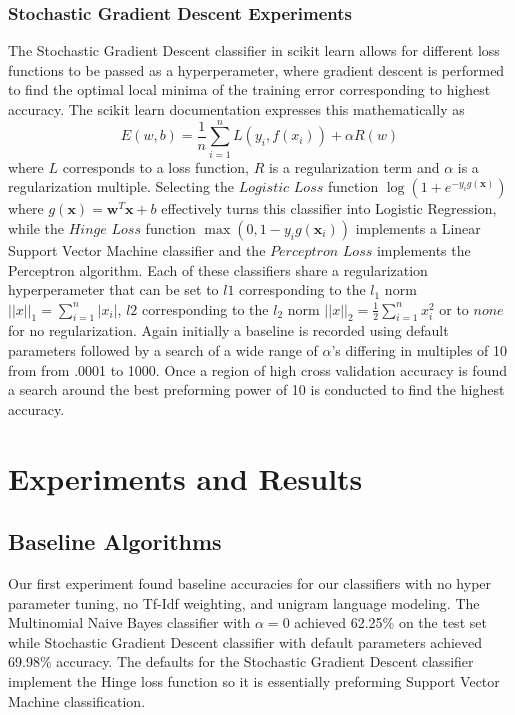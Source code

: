 \documentclass[a4paper, 12pt]{article}
\begin{document}
\subsubsection{Stochastic Gradient Descent Experiments}
The Stochastic Gradient Descent classifier in scikit learn allows for different loss functions to be passed as a hyperperameter, where gradient descent is performed to find the optimal local minima of the training error corresponding to highest accuracy. The scikit learn documentation \cite{pedregosa2011scikit} expresses this mathematically as 
\[E(w,b)=\frac{1}{n}\sum_{i=1}^{n}L(y_i,f(x_i))+\alpha R(w)\]
where $L$ corresponds to a loss function, $R$ is a regularization term and $\alpha$ is a regularization multiple. Selecting the $Logistic$ $Loss$ function $\log(1+e^{-y_ig(\bm{x})})$ where $g(\bm{x})=\bm{w}^T\bm{x}+b$ effectively turns this classifier into Logistic Regression, while the $Hinge$ $Loss$ function  $\max(0, 1 - y_ig(\bm{x}_i))$ implements a Linear Support Vector Machine classifier and the $Perceptron$ $Loss$ implements the Perceptron algorithm.  Each of these classifiers share a regularization hyperperameter that can be set to $l1$ corresponding to the $l_1$ norm $||x||_1=\sum_{i=1}^n |x_i|$, $l2$ corresponding to the $l_2$ norm $||x||_2= \frac{1}{2} \sum_{i=1}^{n} x_i^2$ or to $none$ for no regularization. Again initially a baseline is recorded using default parameters followed by a search of a  wide range of $\alpha$'s differing in multiples of 10 from from .0001 to 1000. Once a region of high cross validation accuracy is found a search around the best preforming power of 10 is conducted to find the highest accuracy.

\noindent
\section{Experiments and Results}
\subsection{Baseline Algorithms}
Our first experiment found baseline accuracies for our classifiers with no hyper parameter tuning, no Tf-Idf weighting, and unigram language modeling. The Multinomial Naive Bayes classifier with $\alpha=0$ achieved  62.25\% on the test set while Stochastic Gradient Descent classifier with default parameters achieved 69.98\% accuracy. The defaults for the Stochastic Gradient Descent classifier implement the Hinge loss function so it is essentially preforming Support Vector Machine classification.
\end{document}
